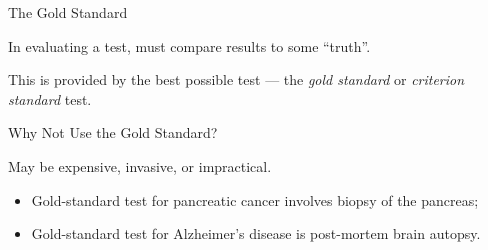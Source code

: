 \begin{frame}{The Gold Standard}

In evaluating a test, must compare results to some ``truth''.

This is provided by the best possible test --- the \emph{gold standard} or \emph{criterion standard} test.

\medskip

	\begin{block}{Why Not Use the Gold Standard?}

		 May be expensive, invasive, or impractical.

		\begin{itemize}

			\item{Gold-standard test for pancreatic cancer involves biopsy of the pancreas;}
			\item{Gold-standard test for Alzheimer's disease is post-mortem brain autopsy.}

		\end{itemize}

	\end{block}

\end{frame}


